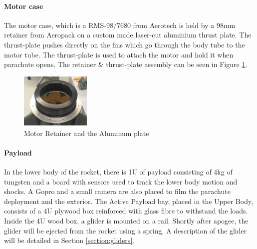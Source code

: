 \paragraph{Motor case}
\hfill \break
The motor case, which is a RMS-98/7680 from Aerotech is held by a 98mm retainer from Aeropack on a custom made laser-cut aluminium thrust plate. The thrust-plate pushes directly on the fins which go through the body tube to the motor tube. The thrust-plate is used to attach the motor and hold it when parachute opens.
 The retainer \& thrust-plate assembly can be seen in Figure \ref{f:motor_retainer_2}.
\begin{figure}[h!]
        \centering
        \includegraphics[width=0.3\textwidth]{img/motor_retainer.jpg}
        \caption{Motor Retainer and the Aluminum plate}
        \label{f:motor_retainer_2}
    \end{figure}


\paragraph{Payload}
\hfill \break
In the lower body of the rocket, there is 1U of payload 
consisting of 4kg of tungsten and a board with sensors used to track the lower body motion and shocks. A Gopro and a small camera are also placed to film the parachute deployment and the exterior.
The Active Payload bay, placed in the Upper Body, consists of a 4U plywood box reinforced with glass fibre to withstand the loads. Inside the 4U wood box, a glider is mounted on a rail. Shortly after apogee, the glider will be ejected from the rocket using a spring. A  description of the glider will be detailed in Section \ref{section:gliders}.




